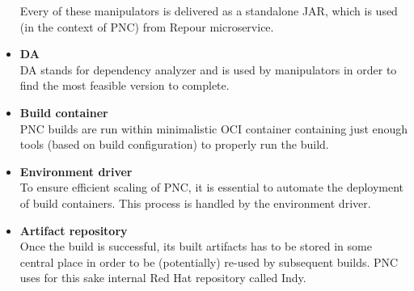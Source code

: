 \documentclass[../main.tex]{subfiles}
\begin{document}
\begin{itemize}
    Every of these manipulators is delivered as a standalone JAR, which is used (in the context of PNC) from Repour microservice.

    \item \textbf{DA}\\
    DA stands for dependency analyzer and is used by manipulators in order to find the most feasible version to complete.

    \item \textbf{Build container}\\
    PNC builds are run within minimalistic OCI container containing just enough tools (based on build configuration) to properly run the build.

    \item \textbf{Environment driver}\\
    To ensure efficient scaling of PNC, it is essential to automate the deployment of build containers. This process is handled by the environment driver.

    \item \textbf{Artifact repository}\\
    Once the build is successful, its built artifacts has to be stored in some central place in order to be (potentially) re-used by subsequent builds. PNC uses for this sake internal Red Hat repository called Indy.

\end{itemize}
\end{document}

